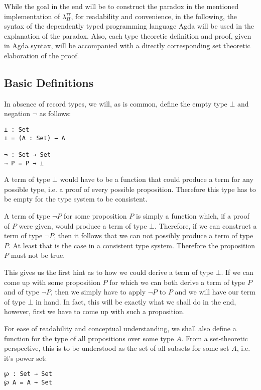 \documentclass[runningheads]{llncs}
\begin{document}
While the goal in the end will be to construct the paradox in the mentioned
implementation of $\lambda_{\Pi}^{\tau \tau}$, for readability and convenience,
in the following, the syntax of the dependently typed programming language Agda
\cite{TheAgdaW80:online} will be used in the explanation of the paradox. Also,
each type theoretic definition and proof, given in Agda syntax, will be accompanied with a
directly corresponding set theoretic elaboration of the proof.

\subsection{Basic Definitions}

In absence of record types, we will, as is common, define the empty type $\bot$
and negation $\neg$ as follows:

\begin{verbatim}
⊥ : Set
⊥ = (A : Set) → A

¬ : Set → Set
¬ P = P → ⊥
\end{verbatim}

A term of type $\bot$ would have to be a function that could produce a term for
any possible type, i.e. a proof of every possible proposition. Therefore this
type has to be empty for the type system to be consistent.

A term of type $\neg P$ for some proposition $P$ is simply a function which, if
a proof of $P$ were given, would produce a term of type $\bot$. Therefore, if we
can construct a term of type $\neg P$, then it follows that we can not possibly
produce a term of type $P$. At least that is the case in a consistent type
system. Therefore the proposition $P$ must not be true.

This gives us the first hint as to how we could derive a term of type $\bot$. If
we can come up with some proposition $P$ for which we can both derive a term of
type $P$ and of type $\neg P$, then we simply have to apply $\neg P$ to $P$ and
we will have our term of type $\bot$ in hand. In fact, this will be exactly what
we shall do in the end, however, first we have to come up with such a
proposition.

For ease of readability and conceptual understanding, we shall also define a
function for the type of all propositions over some type $A$. From a
set-theoretic perspective, this is to be understood as the set of all subsets
for some set $A$, i.e. it's power set:

\begin{verbatim}
℘ : Set → Set
℘ A = A → Set
\end{verbatim}
\end{document}
